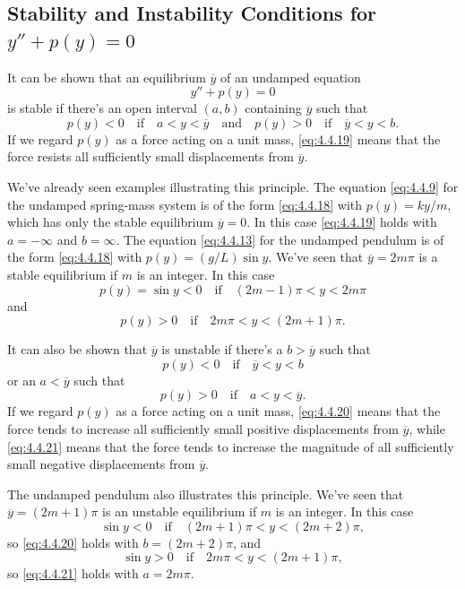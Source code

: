\documentclass{ximera}
\begin{document}
\subsection*{Stability  and Instability Conditions for $y''+p(y)=0$}
 
It can be shown %
that an equilibrium
$\overline{y}$ of an undamped equation
\begin{equation} \label{eq:4.4.18}
y''+p(y)=0
\end{equation}
is stable if there's an open interval $(a,b)$ containing $\overline
y$ such that
\begin{equation} \label{eq:4.4.19}
p(y)<0 \quad\mbox{if}\quad a<y<\overline{y}\quad\mbox{and}\quad p(y)>0 \quad\mbox{if}\quad
\overline{y}<y<b.
\end{equation}
If we regard $p(y)$ as a force acting on a unit mass,
\eqref{eq:4.4.19} means that the force resists all sufficiently small
displacements from $\overline{y}$.
 
 
We've already seen examples illustrating this principle. The equation
\eqref{eq:4.4.9} for the undamped spring-mass system is of the form
\eqref{eq:4.4.18} with $p(y)=ky/m$, which has only the stable equilibrium
$\overline{y}=0$. In this case \eqref{eq:4.4.19} holds with $a=-\infty$ and
$b=\infty$. The equation \eqref{eq:4.4.13} for the undamped pendulum is of
the form \eqref{eq:4.4.18} with $p(y)=(g/L)\sin y$. We've seen that
$\overline{y}=2m\pi$ is a stable equilibrium if $m$ is an integer. In
this case
$$
p(y)=\sin y<0
\quad\mbox{if}\quad(2m-1)\pi<y<2m\pi
$$
and
$$
p(y)>0 \quad\mbox{if}\quad 2m\pi<y<(2m+1)\pi.
$$
 
It can also be shown %
that $\overline{y}$ is
unstable if there's a $b>\overline{y}$ such that
\begin{equation} \label{eq:4.4.20}
p(y)<0\quad\mbox{if}\quad\overline{y}<y<b
\end{equation}
or an $a<\overline{y}$ such that
\begin{equation} \label{eq:4.4.21}
p(y)>0\quad\mbox{if}\quad a<y<\overline{y}.
\end{equation}
If we regard $p(y)$ as a force acting on a unit mass,
\eqref{eq:4.4.20} means that the force tends to increase all sufficiently
small positive displacements from $\overline{y}$, while \eqref{eq:4.4.21}
means that the force tends to increase the magnitude of all
sufficiently small negative displacements from $\overline{y}$.
 
The undamped pendulum also illustrates this principle. We've seen that
$\overline{y}=(2m+1)\pi$ is an unstable equilibrium if $m$ is an
integer. In this case
$$
\sin y<0\quad\mbox{if}\quad(2m+1)\pi<y<(2m+2)\pi,
$$
so \eqref{eq:4.4.20} holds with $b=(2m+2)\pi$, and
$$
\sin y>0\quad\mbox{if}\quad 2m\pi<y<(2m+1)\pi,
$$
so \eqref{eq:4.4.21} holds with $a=2m\pi$.
 
\end{document}
